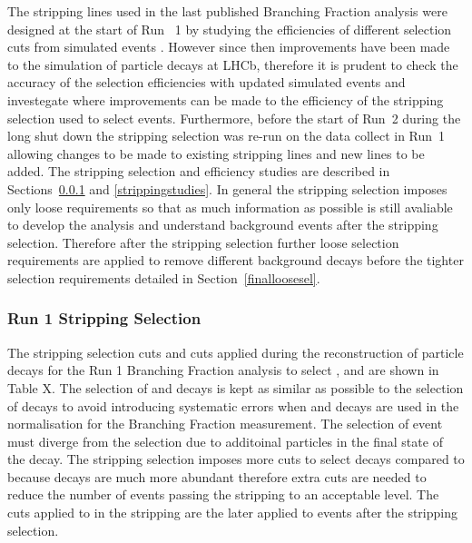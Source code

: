 The stripping lines used in the last published Branching Fraction analysis were designed at the start of Run ~1 by studying the efficiencies of different selection cuts from simulated events \cite{}. However since then improvements have been made to the simulation of particle decays at LHCb, therefore it is prudent to check the accuracy of the selection efficiencies with updated simulated events and investegate where improvements can be made to the efficiency of the stripping selection used to select \bsmumu events.  Furthermore,  before the start of Run~2 during the long shut down the stripping selection was re-run on the data collect in Run~1 allowing changes to be made to existing stripping lines and new lines to be added. The stripping selection and efficiency studies are described in Sections~\ref{strippingold} and \ref{strippingstudies}. %
In general the stripping selection imposes only loose requirements so that as much information as possible is still avaliable to develop the analysis and understand background events after the stripping selection. Therefore after the stripping selection further loose selection requirements are applied to remove different background decays before the tighter selection requirements detailed in Section~\ref{finalloosesel}.




\subsubsection{Run 1 Stripping Selection}
\label{strippingold}
The stripping selection cuts and cuts applied during the reconstruction of particle decays for the Run 1 \bmumu Branching Fraction analysis \cite{} to select \bmumu, \bhh and \bujpsik are shown in Table X. The selection of \bujpsik and \bhh decays is kept as similar as possible to the selection of \bsmumu decays to avoid introducing systematic errors when \bhh and \bujpsik decays are used in the normalisation for the Branching Fraction measurement. The selection of \bujpsik event must diverge from the \bsmumu selection due to additoinal particles in the final state of the decay. The stripping selection imposes more cuts to select \bhh decays compared to \bsmumu because \bhh decays are much more abundant therefore extra cuts are needed to reduce the number of events passing the stripping to an acceptable level. The cuts applied to \bhh in the stripping are the later applied to \bsmumu events after the stripping selection. 


